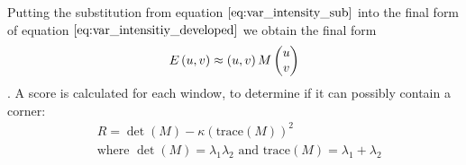 Putting the substitution from equation $\ref{eq:var_intensity_sub}$ into the final form of equation $\ref{eq:var_intensitiy_developed}$ we obtain the final form
\begin{equation}
	E \left( u, v \right) \approx \left( u,v \right) M \colvec{u}{v}
\end{equation}.
A score is calculated for each window, to determine if it can possibly contain a corner:
\begin{equation}
\begin{aligned}
& R = \det(M) - \kappa \left(\text{trace}(M)\right)^2 \\
&\text{where } \det(M) = \lambda_1 \lambda_2 \text{ and } \text{trace}(M) = \lambda_1 + \lambda_2
\end{aligned}
\label{eq:harris_response}
\end{equation}

